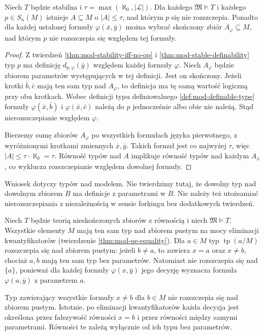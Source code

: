\begin{twierdzenie}
\label{thm:mod-stable-nonsplitting-base}
Niech $T$ będzie stabilna i
$\tau=\max(\aleph_0,|\mathcal L|)$.
Dla każdego $\mathfrak M\models T$ i każdego
$p\in S_n(M)$ istnieje $A\subseteq M$ o
$|A|\leq\tau$, nad którym $p$ się nie rozszczepia.
Ponadto dla każdej ustalonej formuły
$\varphi(\bar x,\bar y)$ można wybrać skończony
zbiór $A_\varphi\subseteq M$, nad którym $p$
nie rozszczepia się względem tej formuły.
\end{twierdzenie}
\begin{proof}
Z twierdzeń \ref{thm:mod-stability-iff-no-op}
i \ref{thm:mod-stable-definability} typ $p$
ma definicję $d_{p,\varphi}(\bar y)$ względem
każdej formuły $\varphi$.
Niech $A_\varphi$ będzie zbiorem parametrów
występujących w tej definicji. Jest on skończony.
Jeżeli krotki $\bar b,\bar c$ mają ten sam typ
nad $A_\varphi$, to definicja ma tę samą
wartość logiczną przy obu krotkach.
Wobec definicji typu definiowalnego
\ref{def:mod-definable-type} formuły
$\varphi(\bar x,\bar b)$ i $\varphi(\bar x,\bar c)$
należą do $p$ jednocześnie albo obie nie należą.
Stąd nierozszczepianie względem $\varphi$.

Bierzemy sumę zbiorów $A_\varphi$ po wszystkich
formułach języka pierwotnego, z wyróżnionymi
krotkami zmiennych $\bar x,\bar y$.
Takich formuł jest co najwyżej $\tau$, więc
$|A|\leq\tau\cdot\aleph_0=\tau$.
Równość typów nad $A$ implikuje równość
typów nad każdym $A_\varphi$, co wyklucza
rozszczepianie względem dowolnej formuły.
\end{proof}

Wniosek dotyczy typów nad modelem. Nie twierdzimy
tutaj, że dowolny typ nad dowolnym zbiorem $B$
ma definicje z parametrami w $B$. Nie należy też
utożsamiać nierozszczepiania z niezależnością
w sensie forkingu bez dodatkowych twierdzeń.

\begin{przyklad}
\label{ex:mod-splitting-equality}
Niech $T$ będzie teorią nieskończonych zbiorów
z równością i niech $\mathfrak M\models T$.
Wszystkie elementy $M$ mają ten sam typ nad
zbiorem pustym na mocy eliminacji kwantyfikatorów
(twierdzenie \ref{thm:mod-qe-equality}).
Dla $a\in M$ typ $\operatorname{tp}(a/M)$
rozszczepia się nad zbiorem pustym: jeżeli
$b\ne a$, to zawiera $x=a$ oraz $x\ne b$,
chociaż $a,b$ mają ten sam typ bez parametrów.
Natomiast nie rozszczepia się nad $\{a\}$,
ponieważ dla każdej formuły $\varphi(x,\bar y)$
jego decyzję wyznacza formuła
$\varphi(a,\bar y)$ z parametrem $a$.

Typ zawierający wszystkie formuły $x\ne b$
dla $b\in M$ nie rozszczepia się nad zbiorem
pustym. Istotnie, po eliminacji kwantyfikatorów
każda decyzja jest określona przez fałszywość
równości $x=b$ i przez równości między samymi
parametrami. Równości te zależą wyłącznie
od ich typu bez parametrów.
\end{przyklad}

